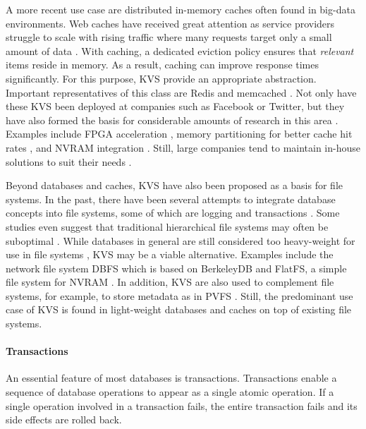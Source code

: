A more recent use case are distributed in-memory caches often found in big-data
environments. Web caches have received great attention as service providers
struggle to scale with rising traffic where many requests target only a small
amount of data \cite{xu2014characterizing}. With caching, a dedicated eviction
policy ensures that \emph{relevant} items reside in memory. As a result, caching
can improve response times significantly. For this purpose, KVS provide an
appropriate abstraction. Important representatives of this class are Redis and
memcached \cite{redis2017home, memcached2017home}. Not only have these KVS been
deployed at companies such as Facebook or Twitter, but they have also formed the
basis for considerable amounts of research in this area
\cite{xu2014characterizing}. Examples include FPGA acceleration
\cite{lavasani2014fpga}, memory partitioning for better cache hit rates
\cite{carra2014memory}, and NVRAM integration \cite{wu2016nvmcached,
malinowski2017using, venkataraman2011consistent}. Still, large companies tend to
maintain in-house solutions to suit their needs \cite{chang2008bigtable,
decandia2007dynamo, lakshman2010cassandra, wang2015hydradb}.

Beyond databases and caches, KVS have also been proposed as a basis for file
systems. In the past, there have been several attempts to integrate database
concepts into file systems, some of which are logging \cite{rosenblum1992design,
tweedie1998journaling} and transactions \cite{seltzer1990transaction,
wright2007extending, spillane2009enabling}. Some studies even suggest that
traditional hierarchical file systems may often be suboptimal
\cite{stein2005stupid, seltzer2009hierarchical}. While databases in general are
still considered too heavy-weight for use in file systems
\cite{seltzer2009hierarchical}, KVS may be a viable alternative. Examples
include the network file system DBFS which is based on BerkeleyDB
\cite{murphy2002design} and FlatFS, a simple file system for NVRAM
\cite{volos2014aerie}. In addition, KVS are also used to complement file
systems, for example, to store metadata as in PVFS \cite{carns2009small}. Still,
the predominant use case of KVS is found in light-weight databases and caches on
top of existing file systems.

\paragraph{Transactions}

An essential feature of most databases is transactions. Transactions enable a
sequence of database operations to appear as a single atomic operation. If a
single operation involved in a transaction fails, the entire transaction fails and its side effects are rolled back.

